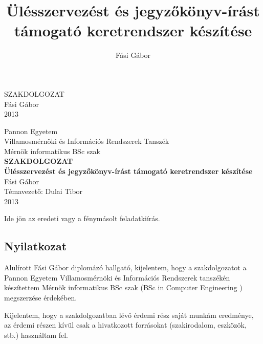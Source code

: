 \documentclass[a4paper,12pt,oneside]{report}
\title{Ülésszervezést és jegyzőkönyv-írást támogató keretrendszer készítése}
\author{Fási Gábor}
\date{}
\begin{document}
\setcounter{chapter}{1}

\pagestyle{empty}
{
    \begin{center}
    \vspace*{5cm}
    {
        \Huge SZAKDOLGOZAT}\\
        \vspace*{10cm}
        {\LARGE Fási Gábor}\\
        \vspace*{3cm}
        {\LARGE 2013}
    \end{center}
}
\newpage

\begin{center}
{
    \Large Pannon Egyetem\\
    Villamosmérnöki és Információs Rendszerek
Tanszék\vspace*{3mm}\\
    Mérnök informatikus BSc szak
}
    \vspace*{2cm}\\
    {\LARGE \bf SZAKDOLGOZAT}
    \vspace{3cm}\\
    {\LARGE\bf Ülésszervezést és jegyzőkönyv-írást támogató keretrendszer   készítése}
    \vspace{3cm}\\
    {\large Fási Gábor}
    \vspace{6cm}
    \\
    {\large Témavezető: Dulai Tibor}
    \vspace{1cm}\\
    {\large 2013}
\end{center}
\normalsize
\newpage

Ide jön az eredeti vagy a fénymásolt feladatkiírás.
\newpage

\begin{center}
\section*{Nyilatkozat}
\end{center}

Alulírott Fási Gábor diplomázó hallgató, kijelentem, hogy a szakdolgozatot a Pannon Egyetem Villamosmérnöki és Információs Rendszerek tanszékén készítettem Mérnök informatikus BSc szak (BSc in Computer Engineering
) megszerzése érdekében.

Kijelentem, hogy a szakdolgozatban lévő érdemi rész saját munkám eredménye, az érdemi részen kívül csak a hivatkozott forrásokat (szakirodalom, eszközök, stb.) használtam fel.
\end{document}
